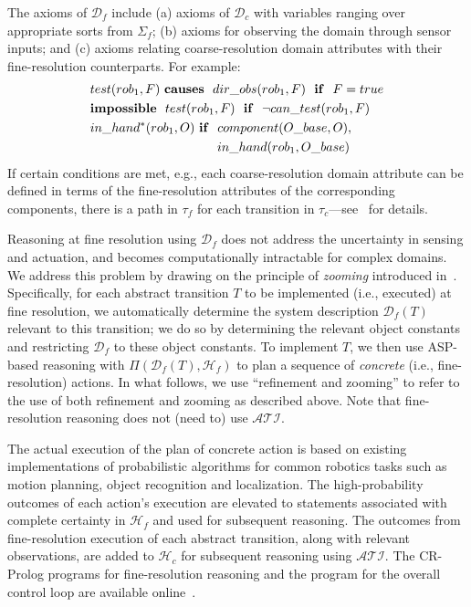 \documentclass[letterpaper, 10 pt, conference]{ieeeconf}  %
\begin{document}
The axioms of $\mathcal{D}_f$ include (a) axioms of $\mathcal{D}_c$
with variables ranging over appropriate sorts from $\Sigma_f$; (b)
axioms for observing the domain through sensor inputs; and (c) axioms
relating coarse-resolution domain attributes with their
fine-resolution counterparts. For example:
\begin{align*}
  &test(rob_1, F) ~{\bf causes}~~dir\_obs(rob_1,F)~~{\bf if }~~F=true \\
  &{\bf impossible}~~test(rob_1, F)~~{\bf if}~~\lnot can\_test(rob_1, F) \\
  &in\_hand^*(rob_1, O) ~{\bf if}~~component(O\_base, O),\\
  &~~~~~~~~~~~~~~~~~~~~~~~~~~~~~~in\_hand(rob_1, O\_base)
\end{align*} 
If certain conditions are met, e.g., each coarse-resolution domain
attribute can be defined in terms of the fine-resolution attributes of
the corresponding components, there is a path in $\tau_f$ for each
transition in $\tau_c$---see~\cite{sridharan2017refinement} for
details.

Reasoning at fine resolution using $\mathcal{D}_f$ does not address
the uncertainty in sensing and actuation, and becomes computationally
intractable for complex domains. We address this problem by drawing on
the principle of \emph{zooming} introduced
in~\cite{sridharan2017refinement}.  Specifically, for each abstract
transition $T$ to be implemented (i.e., executed) at fine resolution,
we automatically determine the system description $\mathcal{D}_f(T)$
relevant to this transition; we do so by determining the relevant
object constants and restricting $\mathcal{D}_f$ to these object
constants. To implement $T$, we then use ASP-based reasoning with
$\Pi(\mathcal{D}_f(T), \mathcal{H}_f)$ to plan a sequence of
\emph{concrete} (i.e., fine-resolution) actions. In what follows, we
use ``refinement and zooming'' to refer to the use of both refinement
and zooming as described above. Note that fine-resolution reasoning
does not (need to) use $\mathcal{ATI}$.

The actual execution of the plan of concrete action is based on
existing implementations of probabilistic algorithms for common
robotics tasks such as motion planning, object recognition and
localization. The high-probability outcomes of each action's execution
are elevated to statements associated with complete certainty in
$\mathcal{H}_f$ and used for subsequent reasoning. The outcomes from
fine-resolution execution of each abstract transition, along with
relevant observations, are added to $\mathcal{H}_c$ for subsequent
reasoning using $\mathcal{ATI}$. The CR-Prolog programs for
fine-resolution reasoning and the program for the overall control loop
are available online~\cite{code-results}.
\end{document}
